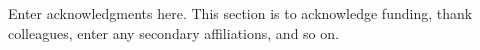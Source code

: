 \documentclass[draft]{agujournal2019}
\begin{document}



\acknowledgments
Enter acknowledgments here. This section is to acknowledge funding, thank colleagues, enter any secondary affiliations, and so on.


%
%





%
%
%
%
%
\end{document}
